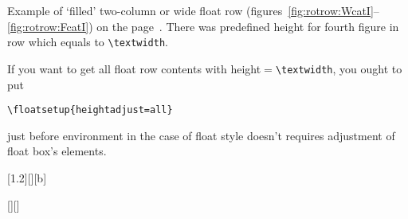 \begin{sidewaystextbox*}
\wideemptyfloatpage
\tcapside[1.2\hsize]
{\TEXTBOX[ \text.]}
{\caption{Beside caption. \text. \text. \text}%
\label{rot:wbeside:text}}
\end{sidewaystextbox*}

\Text

\fi
\clearpage

\newdimen\rottextwidth\rottextwidth\textwidth

Example of `filled' two-column or wide float row
(figures~\ref{fig:rotrow:WcatI}--\ref{fig:rotrow:FcatI})
on the page~\pageref{fig:rotrow:WcatI}.
There was predefined height for fourth figure in row which equals to \verb|\textwidth|.

If you want to get all float row contents with height${}={}$\verb|\textwidth|, you ought to put
\begin{verbatim}
\floatsetup{heightadjust=all}
\end{verbatim}
just before  environment in the case of float style doesn't requires adjustment of float box's
elements.

\begin{sidewaysfigure*}
\wideemptyfloatpage
\begin{floatrow}[4]
%
{\caption{Beside figure~I in wide rotated float row. Vertically centered}%
\label{fig:rotrow:WcatI}}%

[1.2\FBwidth][][b]
{\caption{Beside figure~II in wide rotated float row. Flushed to bottom of box}%
\label{fig:rotrow:BcatI}%
}%
{}%

%
{\caption{Beside figure~III in wide rotated float row. Flushed to top of object box}%
\label{fig:rotrow:mouseI}}%

[\Xhsize][\rottextwidth]
{\caption{Beside figure~IV in wide rotated float row.
When you put height argument in float row you must
put flag \protect{} (and maybe \protect{})
just before  to get
correct height of float box}\label{fig:rotrow:FcatI}}%
{\Resizebox\hsize{}}
\end{floatrow}
\end{sidewaysfigure*}

